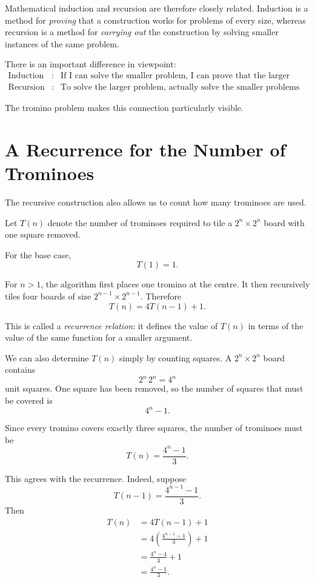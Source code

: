\documentclass[12pt]{article}
\begin{document}
Mathematical induction and recursion are therefore closely related.
Induction is a method for \emph{proving} that a construction works for
problems of every size, whereas recursion is a method for
\emph{carrying out} the construction by solving smaller instances of
the same problem.

There is an important difference in viewpoint:
\[
\begin{array}{ccl}
\text{Induction} &:&
\text{If I can solve the smaller problem, I can prove that the
larger problem can be solved;}\\[1mm]
\text{Recursion} &:&
\text{To solve the larger problem, actually solve the smaller
problems using the same procedure.}
\end{array}
\]

The tromino problem makes this connection particularly visible.


\section{A Recurrence for the Number of Trominoes}

The recursive construction also allows us to count how many trominoes
are used.

Let $T(n)$ denote the number of trominoes required to tile a
$2^n\times2^n$ board with one square removed.

For the base case,
\[
        T(1)=1.
\]

For $n>1$, the algorithm first places one tromino at the centre. It
then recursively tiles four boards of size
$2^{n-1}\times2^{n-1}$. Therefore
\[
        \boxed{T(n)=4T(n-1)+1.}
\]

This is called a \emph{recurrence relation}: it defines the value of
$T(n)$ in terms of the value of the same function for a smaller
argument.

We can also determine $T(n)$ simply by counting squares. A
$2^n\times2^n$ board contains
\[
        2^n\,2^n=4^n
\]
unit squares. One square has been removed, so the number of squares
that must be covered is
\[
        4^n-1.
\]

Since every tromino covers exactly three squares, the number of
trominoes must be
\[
        T(n)=\frac{4^n-1}{3}.
\]

This agrees with the recurrence. Indeed, suppose
\[
        T(n-1)=\frac{4^{n-1}-1}{3}.
\]
Then
\[
\begin{aligned}
T(n)
    &=4T(n-1)+1\\
    &=4\left(\frac{4^{n-1}-1}{3}\right)+1\\
    &=\frac{4^n-4}{3}+1\\
    &=\frac{4^n-1}{3}.
\end{aligned}
\]
\end{document}
